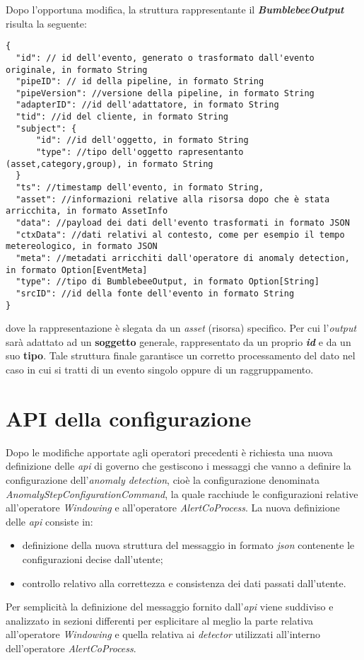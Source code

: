 Dopo l'opportuna modifica, la struttura rappresentante il \textbf{\textit{BumblebeeOutput}} risulta la seguente:

\begin{verbatim}
{
  "id": // id dell'evento, generato o trasformato dall'evento originale, in formato String
  "pipeID": // id della pipeline, in formato String
  "pipeVersion": //versione della pipeline, in formato String
  "adapterID": //id dell'adattatore, in formato String
  "tid": //id del cliente, in formato String
  "subject": {
	  "id": //id dell'oggetto, in formato String
	  "type": //tipo dell'oggetto rapresentanto (asset,category,group), in formato String
  }
  "ts": //timestamp dell'evento, in formato String,
  "asset": //informazioni relative alla risorsa dopo che è stata arricchita, in formato AssetInfo
  "data": //payload dei dati dell'evento trasformati in formato JSON
  "ctxData": //dati relativi al contesto, come per esempio il tempo metereologico, in formato JSON
  "meta": //metadati arricchiti dall'operatore di anomaly detection, in formato Option[EventMeta]
  "type": //tipo di BumblebeeOutput, in formato Option[String]
  "srcID": //id della fonte dell'evento in formato String
}
\end{verbatim}
dove la rappresentazione è slegata da un \textit{asset} (risorsa) specifico. Per cui l'\textit{output} sarà adattato ad un \textbf{soggetto} generale, rappresentato da un proprio \textbf{\textit{id}} e da un suo \textbf{tipo}.
Tale struttura finale garantisce un corretto processamento del dato nel caso in cui si tratti di un evento singolo oppure di un raggruppamento.


\section{API della configurazione}\label{sec:api-configurazione}
Dopo le modifiche apportate agli operatori precedenti è richiesta una nuova definizione delle \textit{\gls{api}} di governo che gestiscono i messaggi che vanno a definire la configurazione dell'\textit{anomaly detection}, cioè la configurazione denominata \textit{AnomalyStepConfigurationCommand}, la quale racchiude le configurazioni relative all'operatore \textit{Windowing} e all'operatore \textit{AlertCoProcess}. La nuova definizione delle \textit{\gls{api}} consiste in:

\begin{itemize}
	\item{definizione della nuova struttura del messaggio in formato \textit{\gls{json}} contenente le configurazioni decise dall'utente;}
	\item{controllo relativo alla correttezza e consistenza dei dati passati dall'utente.}
\end{itemize}
Per semplicità la definizione del messaggio fornito dall'\textit{\gls{api}} viene suddiviso e analizzato in sezioni differenti per esplicitare al meglio la parte relativa all'operatore \textit{Windowing} e quella relativa ai \textit{detector} utilizzati all'interno dell'operatore \textit{AlertCoProcess}.




